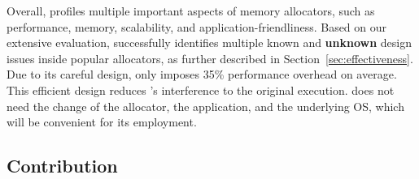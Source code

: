  

Overall, \MP{} profiles multiple important aspects of memory allocators, such as performance, memory, scalability, and application-friendliness. Based on our extensive evaluation, \MP{} successfully identifies multiple known and \textbf{unknown} design issues inside popular allocators, as further described in Section~\ref{sec:effectiveness}. Due to its careful design, \MP{} only imposes 35\% performance overhead on average. This efficient design reduces \MP{}'s interference to the original execution. \MP{} does not need the change of the allocator, the application, and the underlying OS, which will be convenient for its employment. 


\subsection*{Contribution}

